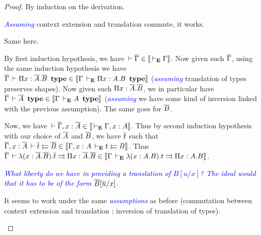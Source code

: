 \documentclass{amsart}
\newcommand\meta[1]{\noindent\textcolor{blue}{\emph{#1}}}
\begin{document}
\begin{proof}
  By induction on the derivation.
  \begin{caselist}
    \nextcase
    \begin{mathc}
    \end{mathc}
    \meta{Assuming} context extension and translation commute, it works.

    \nextcase
    \begin{mathc}
    \end{mathc}
    Same here.

    \nextcase
    \begin{mathc}
    \end{mathc}
    By first induction hypothesis, we have $\,\vdash \overline{\Gamma} \in \mathopen{{[\kern-0.14em[}} \,\vdash_\mathbf{E} \Gamma \mathclose{{]\kern-0.14em]}}$.
    Now given such $\overline{\Gamma}$, using the same induction hypothesis we have
    $\overline{\Gamma} \,\vdash \Pi x:\overline{A}.\overline{B}\ \operatorname{\mathbf{type}}
    \in \mathopen{{[\kern-0.14em[}} \Gamma \,\vdash_\mathbf{E} \Pi x:A.B\ \operatorname{\mathbf{type}} \mathclose{{]\kern-0.14em]}}$
    (\meta{assuming} translation of types preserves shapes).
    Now given such $\Pi x:\overline{A}.\overline{B}$, we in particular have
    $\barG \der \barA\ \type \in \den{\Gamma \dere A\ \type}$
    (\meta{assuming} we have some kind of inversion linked with the previous
    assumption). The same goes for $\overline{B}$.

    Now, we have $\,\vdash \overline{\Gamma}, x:\overline{A} \in \mathopen{{[\kern-0.14em[}} \,\vdash_\mathbf{E} \Gamma, x:A \mathclose{{]\kern-0.14em]}}$.
    Thus by second induction hypothesis with our choice of $\overline{A}$ and
    $\overline{B}$, we have $\overline{t}$ such that
    $\overline{\Gamma}, x:\overline{A} \,\vdash \overline{t} \leftleftarrows \overline{B} \in
    \mathopen{{[\kern-0.14em[}} \Gamma, x:A \,\vdash_\mathbf{E} t \leftleftarrows B \mathclose{{]\kern-0.14em]}}$.
    Thus $\overline{\Gamma} \,\vdash \lambda (x:\overline{A}.\overline{B}).\overline{t} \rightrightarrows \Pi x:\overline{A}.\overline{B}
    \in \mathopen{{[\kern-0.14em[}} \Gamma \,\vdash_\mathbf{E} \lambda (x:A.B).t \rightrightarrows \Pi x:A.B \mathclose{{]\kern-0.14em]}}$.

    \nextcase
    \begin{mathc}
    \end{mathc}
    \meta{What liberty do we have in providing a translation of $B[u/x]$? The
    ideal would that it has to be of the form $\overline{B}[\overline{u}/x]$.}

    \nextcase
    \begin{mathc}
    \end{mathc}
    It seems to work under the same \meta{assumptions} as before (commutation
    between context extension and translation ; inversion of translation of
    types).


\end{caselist}
\end{proof}
\end{document}
